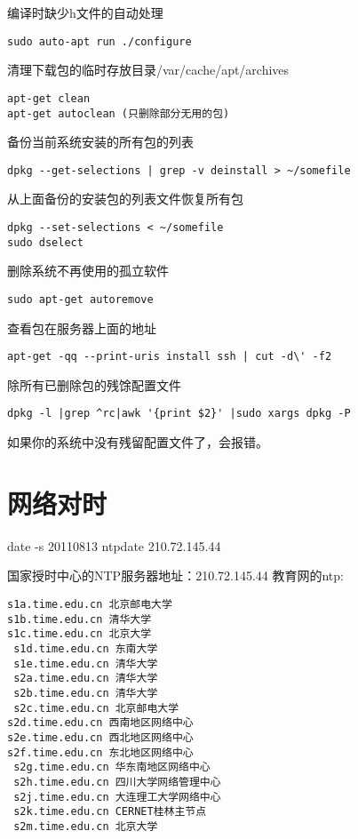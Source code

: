 编译时缺少h文件的自动处理
\begin{verbatim}
sudo auto-apt run ./configure
\end{verbatim}

清理下载包的临时存放目录/var/cache/apt/archives
\begin{verbatim}
apt-get clean
apt-get autoclean (只删除部分无用的包)
\end{verbatim}

备份当前系统安装的所有包的列表
\begin{verbatim}
dpkg --get-selections | grep -v deinstall > ~/somefile
\end{verbatim}

从上面备份的安装包的列表文件恢复所有包
\begin{verbatim}
dpkg --set-selections < ~/somefile
sudo dselect
\end{verbatim}

删除系统不再使用的孤立软件
\begin{verbatim}
sudo apt-get autoremove
\end{verbatim}

查看包在服务器上面的地址
\begin{verbatim}
apt-get -qq --print-uris install ssh | cut -d\' -f2
\end{verbatim}

除所有已删除包的残馀配置文件
\begin{verbatim}
dpkg -l |grep ^rc|awk '{print $2}' |sudo xargs dpkg -P 
\end{verbatim}
如果你的系统中没有残留配置文件了，会报错。

\section{网络对时}
\begin{shellcmd}
date -s 20110813
ntpdate 210.72.145.44
\end{shellcmd}

国家授时中心的NTP服务器地址：210.72.145.44
教育网的ntp:
\begin{verbatim}
s1a.time.edu.cn 北京邮电大学
s1b.time.edu.cn 清华大学
s1c.time.edu.cn 北京大学
 s1d.time.edu.cn 东南大学
 s1e.time.edu.cn 清华大学
 s2a.time.edu.cn 清华大学
 s2b.time.edu.cn 清华大学
 s2c.time.edu.cn 北京邮电大学
s2d.time.edu.cn 西南地区网络中心
s2e.time.edu.cn 西北地区网络中心
s2f.time.edu.cn 东北地区网络中心
 s2g.time.edu.cn 华东南地区网络中心
 s2h.time.edu.cn 四川大学网络管理中心
 s2j.time.edu.cn 大连理工大学网络中心
 s2k.time.edu.cn CERNET桂林主节点
 s2m.time.edu.cn 北京大学
\end{verbatim}
